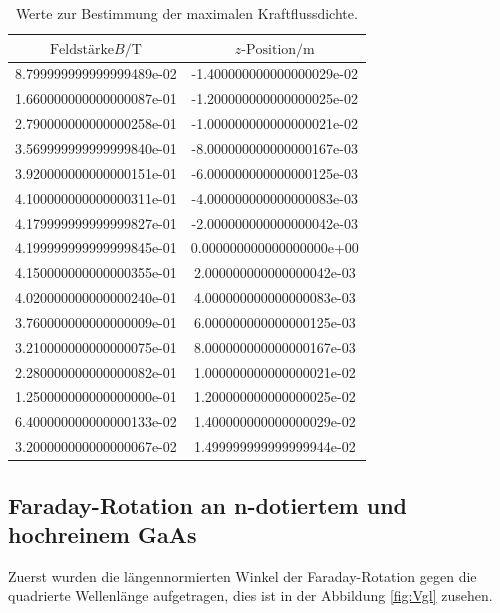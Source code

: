   \begin{table}
   \centering
   \begin{tabular}{S S}
     \toprule
      $\text{Feldstärke} B /\si{\tesla} $ & $z \text{-Position} / \si{\meter} $\\
     \midrule
       8.799999999999999489e-02 & -1.400000000000000029e-02\\
       1.660000000000000087e-01 & -1.200000000000000025e-02\\
       2.790000000000000258e-01 & -1.000000000000000021e-02\\
       3.569999999999999840e-01 & -8.000000000000000167e-03\\
       3.920000000000000151e-01 & -6.000000000000000125e-03\\
       4.100000000000000311e-01 & -4.000000000000000083e-03\\
       4.179999999999999827e-01 & -2.000000000000000042e-03\\
       4.199999999999999845e-01 & 0.000000000000000000e+00\\
       4.150000000000000355e-01 & 2.000000000000000042e-03\\
       4.020000000000000240e-01 & 4.000000000000000083e-03\\
       3.760000000000000009e-01 & 6.000000000000000125e-03\\
       3.210000000000000075e-01 & 8.000000000000000167e-03\\
       2.280000000000000082e-01 & 1.000000000000000021e-02\\
       1.250000000000000000e-01 & 1.200000000000000025e-02\\
       6.400000000000000133e-02 & 1.400000000000000029e-02\\
       3.200000000000000067e-02 & 1.499999999999999944e-02\\
     \bottomrule
   \end{tabular}
   \caption{Werte zur Bestimmung der maximalen Kraftflussdichte.}
   \label{tab:BFeld}
  \end{table}

\subsection{Faraday-Rotation an n-dotiertem und hochreinem GaAs}
Zuerst wurden die längennormierten Winkel der Faraday-Rotation gegen die quadrierte Wellenlänge 
aufgetragen, dies ist in der Abbildung \ref{fig:Vgl} zusehen. 


